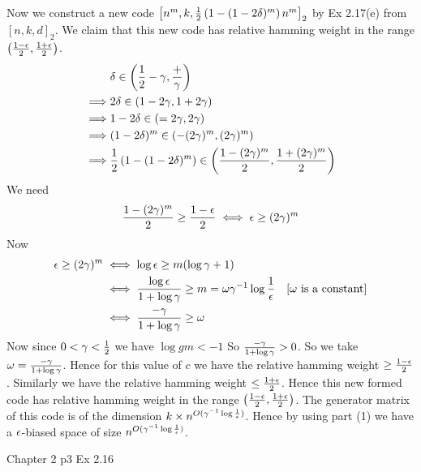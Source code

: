 \documentclass[a4paper, 11pt]{article}
\begin{document}
{\begin{enumerate}
		Now we construct a new code $\left[n^m,k,\frac12\left(1-(1-2\delta)^m\right)n^m  \right]_2$ by Ex 2.17(e) from $[n,k,d]_2$. We claim that this new code has relative hamming weight in the range $\left(\frac{1-\epsilon}{2},\frac{1+\epsilon}{2}\right)$. \begin{align*}
			         & \delta \in \left(\frac12-\gamma,\frac+{\gamma}\right)                                                \\
			\implies & 2\delta \in (1-2\gamma,1+2\gamma)                                                             \\
			\implies & 1-2\delta\in (=2\gamma,2\gamma)                                                               \\
			\implies & (1-2\delta)^m\in (-(2\gamma)^m,(2\gamma)^m)                                                   \\
			\implies & \frac12\left( 1-(1-2\delta)^m \right)\in \left(\frac{1-(2\gamma)^m}{2},\frac{1+(2\gamma)^m}{2}  \right)
		\end{align*}We need $$\frac{1-(2\gamma)^m}{2}\geq \frac{1-\epsilon}{2}\iff \epsilon\geq (2\gamma)^m$$Now \begin{align*}
		\epsilon \geq (2\gamma)^m & \iff \log \epsilon \geq m(\log \gamma +1)\\
		& \iff \frac{\log \epsilon}{1+\log \gamma}\geq m=\omega \gamma^{-1}\log \frac1{\epsilon}\quad [\text{$\omega$ is a constant}]\\
		& \iff \frac{-\gamma}{1+\log \gamma}\geq \omega
	\end{align*}Now since $0<\gamma<\frac12$ we have $\log gm<-1$ So $\frac{-\gamma}{1+\log \gamma}>0$. So we take $\omega=\frac{-\gamma}{1+\log \gamma}$. Hence for this value of $c$ we have the relative hamming weight $\geq \frac{1-\epsilon}{2}$. Similarly we have the relative hamming weight $\leq \frac{1+\epsilon}{2}$. Hence this new formed code has relative hamming weight in the range $\left(  \frac{1-\epsilon}{2},\frac{1+\epsilon}{2}\right)$. The generator matrix of this code is of the dimension $k\times n^{O(\gamma^{-1}\log \frac1{\epsilon})}$. Hence by using part (1) we have a $\epsilon$-biased space of size $n^{O(\gamma^{-1}\log \frac1{\epsilon})}$. 
	\end{enumerate}
}

\begin{problem}{%
		Chapter 2
	}{p3%
	}
	Ex 2.16
\end{problem}
\end{document}
